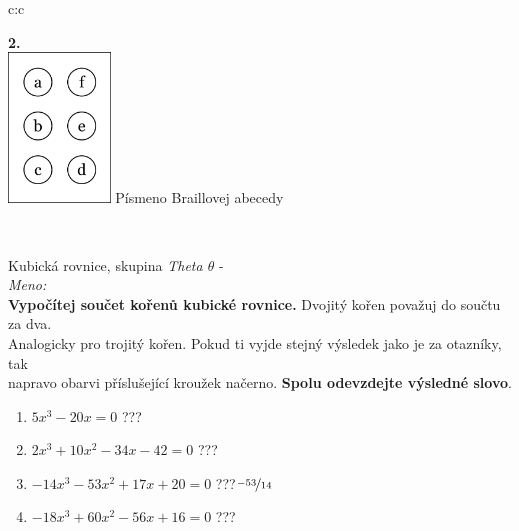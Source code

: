 \documentclass[10pt]{report}
\begin{document}
\begin{tabular}{c:c}
\begin{minipage}[c][99mm][t]{0.49\linewidth}
\begin{center}
\begin{minipage}{0.77\linewidth}
\begin{center}
\end{center}
\end{minipage}
\begin{minipage}{0.20\linewidth}
\begin{center}
{\Huge\bfseries 2.} \\[2mm]
\includegraphics[height=40mm]{../images/braille.png}
{\small Písmeno Braillovej abecedy}
\end{center}
\end{minipage}
\end{center}
\end{minipage}
\\ \hdashline
\begin{minipage}[c][99mm][t]{0.49\linewidth}
\begin{center}
\vspace{7mm}
{\huge Kubická rovnice, skupina \textit{Theta $\theta$} -}\\[4.5mm]
\textit{Meno:}\phantom{xxxxxxxxxxxxxxxxxxxxxxxxxxxxxxxxxxxxxxxxxxxxxxxxxxxxxxxxxxxxxxxxx}\\[3.5mm]
\textbf{Vypočítej součet kořenů kubické rovnice.} Dvojitý kořen považuj do součtu za dva.\\Analogicky pro trojitý kořen. Pokud ti vyjde stejný výsledek jako je za otazníky, tak\\napravo obarvi příslušející kroužek načerno. \textbf{Spolu odevzdejte výsledné slovo}.\\[3mm]
\begin{minipage}{0.77\linewidth}
\begin{center}
\begin{varwidth}{\textwidth}
\begin{enumerate}
\large
\item $5x^3-20x=0$\quad \dotfill\; ???\;\dotfill {}
\item $2x^3+10x^2-34x-42=0$\quad \dotfill\; ???\;\dotfill {}
\item $-14x^3-53x^2+17x+20=0$\quad \dotfill\; ???\;\dotfill \quad $\nicefrac{-53}{14}$
\item $-18x^3+60x^2-56x+16=0$\quad \dotfill\; ???\;\dotfill {}

\end{enumerate}
\end{varwidth}
\end{center}
\end{minipage}
\end{center}
\end{minipage}
\end{tabular}
\end{document}

